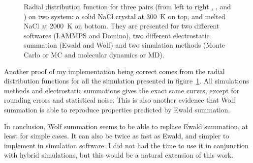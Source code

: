 \documentclass[thesis]{subfiles}
\begin{document}
\begin{figure}[t]
    \centering
    
    \caption{Radial distribution function for three pairs (from left to right
    , , and ) on two system: a solid NaCl crystal
    at \SI{300}{K} on top, and melted NaCl at \SI{2000}{K} on bottom. They are
    presented for two different softwares (LAMMPS and Domino), two different
    electrostatic summation (Ewald and Wolf) and two simulation methods (Monte
    Carlo or MC and molecular dynamics or MD).}
    \label{fig:ewald-vs-wolf:rdf}
\end{figure}

Another proof of my implementation being correct comes from the radial
distribution functions for all the simulation presented in
figure~\ref{fig:ewald-vs-wolf:rdf}. All simulations methods and electrostatic
summations gives the exact same curves, except for rounding errors and
statistical noise. This is also another evidence that Wolf summation is able to
reproduce properties predicted by Ewald summation.

In conclusion, Wolf summation seems to be able to replace Ewald summation, at
least for simple cases. It can also be twice as fast as Ewald, and simpler to
implement in simulation software. I did not had the time to use it in
conjunction with hybrid simulations, but this would be a natural extension of
this work.

\OnlyInSubfile{\printglobalbibliography}
\end{document}
